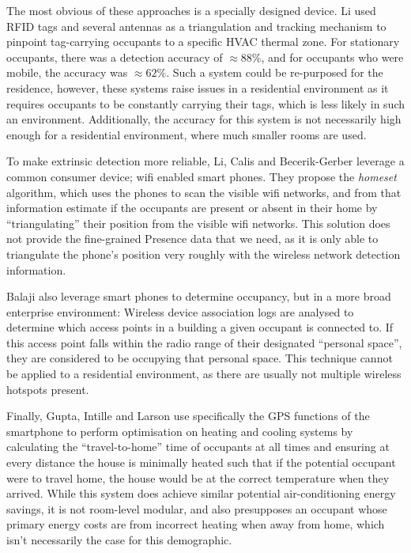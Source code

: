 \documentclass[../thesis/thesis.tex]{subfiles}
\begin{document}
The most obvious of these approaches is a specially designed device. Li \etal \cite{li2012measuring} used RFID tags and several antennas as a triangulation and tracking mechanism to pinpoint tag-carrying occupants to a specific HVAC thermal zone. For stationary occupants, there was a detection accuracy of $\approx88\%$, and for occupants who were mobile, the accuracy was $\approx62\%$. Such a system could be re-purposed for the residence, however, these systems raise issues in a residential environment as it requires occupants to be constantly carrying their tags, which is less likely in such an environment. Additionally, the accuracy for this system is not necessarily high enough for a residential environment, where much smaller rooms are used.

To make extrinsic detection more reliable, Li, Calis and Becerik-Gerber \cite{kleiminger2013inferring} leverage a common consumer device; wifi enabled smart phones. They propose the \textit{homeset} algorithm, which uses the phones to scan the visible wifi networks, and from that information estimate if the occupants are present or absent in their home by ``triangulating'' their position from the visible wifi networks. This solution does not provide the fine-grained Presence data that we need, as it is only able to triangulate the phone's position very roughly with the wireless network detection information.

Balaji \etal \cite{balaji2013sentinel} also leverage smart phones to determine occupancy, but in a more broad enterprise environment: Wireless device association logs are analysed to determine which access points in a building a given occupant is connected to. If this access point falls within the radio range of their designated ``personal space'', they are considered to be occupying that personal space. This technique cannot be applied to a residential environment, as there are usually not multiple wireless hotspots present.

Finally, Gupta, Intille and Larson \cite{gupta2009adding} use specifically the GPS functions of the smartphone to perform optimisation on heating and cooling systems by calculating the ``travel-to-home'' time of occupants at all times and ensuring at every distance the house is minimally heated such that if the potential occupant were to travel home, the house would be at the correct temperature when they arrived. While this system does achieve similar potential air-conditioning energy savings, it is not room-level modular, and also presupposes an occupant whose primary energy costs are from incorrect heating when away from home, which isn't necessarily the case for this demographic.
\end{document}
